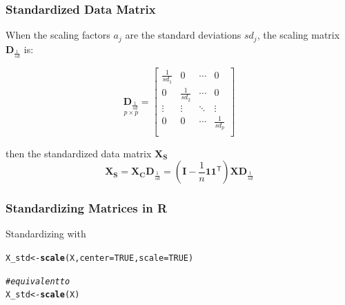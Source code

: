 \documentclass[12pt]{beamer}\usepackage[]{graphicx}\usepackage[]{color}
\makeatletter
\newcommand{\hlnum}[1]{\textcolor[rgb]{0.686,0.059,0.569}{#1}}%
\newcommand{\hlcom}[1]{\textcolor[rgb]{0.678,0.584,0.686}{\textit{#1}}}%
\newcommand{\hlstd}[1]{\textcolor[rgb]{0.345,0.345,0.345}{#1}}%
\newcommand{\hlkwb}[1]{\textcolor[rgb]{0.69,0.353,0.396}{#1}}%
\newcommand{\hlkwc}[1]{\textcolor[rgb]{0.333,0.667,0.333}{#1}}%
\newcommand{\hlkwd}[1]{\textcolor[rgb]{0.737,0.353,0.396}{\textbf{#1}}}%
\newenvironment{kframe}{%
 \def\at@end@of@kframe{}%
 \ifinner\ifhmode%
  \def\at@end@of@kframe{\end{minipage}}%
  \begin{minipage}{\columnwidth}%
 \fi\fi%
 \def\FrameCommand##1{\hskip\@totalleftmargin \hskip-\fboxsep
 \colorbox{shadecolor}{##1}\hskip-\fboxsep
     \hskip-\linewidth \hskip-\@totalleftmargin \hskip\columnwidth}%
 \MakeFramed {\advance\hsize-\width
   \@totalleftmargin\z@ \linewidth\hsize
   \@setminipage}}%
 {\par\unskip\endMakeFramed%
 \at@end@of@kframe}
\newenvironment{knitrout}{}{} %
\makeatother
\begin{document}

\begin{frame}
\frametitle{Standardized Data Matrix}

When the scaling factors $a_j$ are the standard deviations $sd_j$, 
the scaling matrix $\mathbf{D}_{\frac{1}{sd}}$ is:

\[ \underset{p \times p}{\mathbf{D}_{\frac{1}{sd}}} = 
\left[\begin{array}{cccc}
\frac{1}{sd_1} & 0 & \cdots & 0 \\
0 & \frac{1}{sd_2} & \cdots & 0 \\
\vdots & \vdots & \ddots & \vdots \\
0 & 0 & \cdots & \frac{1}{sd_p} \\
\end{array}\right]
\]

then the standardized data matrix $\mathbf{X_S}$
$$
\mathbf{X_S} = \mathbf{X_C} \mathbf{D}_{\frac{1}{sd}} = (\mathbf{I} - \frac{1}{n} \mathbf{11^\mathsf{T}}) \mathbf{X} \mathbf{D}_{\frac{1}{sd}}
$$

\end{frame}


\begin{frame}[fragile]
\frametitle{Standardizing Matrices in R}

Standardizing with 

\begin{knitrout}\footnotesize
{}\color{fgcolor}\begin{kframe}
\begin{alltt}
\hlstd{X_std} \hlkwb{<-} \hlkwd{scale}\hlstd{(X,} \hlkwc{center} \hlstd{=} \hlnum{TRUE}\hlstd{,} \hlkwc{scale} \hlstd{=} \hlnum{TRUE}\hlstd{)}

\hlcom{# equivalent to}
\hlstd{X_std} \hlkwb{<-} \hlkwd{scale}\hlstd{(X)}
\end{alltt}
\end{kframe}
\end{knitrout}

\end{frame}


\begin{frame}
\begin{center}
\Huge{}
\end{center}
\end{frame}
\end{document}
